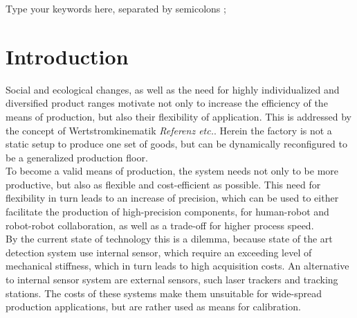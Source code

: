 \documentclass[5p,times,procedia]{elsarticle}
\begin{document}
\begin{frontmatter}
\begin{keyword}
Type your keywords here, separated by semicolons ;




\end{keyword}

\end{frontmatter}



\section{Introduction}

%
%
%
%
%

Social and ecological changes, as well as the need for
highly individualized and diversified product ranges
motivate not only to increase the efficiency of the means
of production, but also their flexibility of application.
This is addressed by the concept of Wertstromkinematik \textit{Referenz etc.}.
Herein the factory is not a static setup to produce
one set of goods, but can be dynamically reconfigured to be a generalized production floor.\\
To become a valid means of production, the system needs not only to
be more productive, but also as flexible and cost-efficient as possible. This need for flexibility in turn leads to an increase of precision, which can be used to either facilitate the production of high-precision components, for human-robot and robot-robot collaboration, as well as a trade-off for higher process speed.\\
By the current state of technology this is a dilemma, because state of the art detection system use internal sensor, which require an exceeding level of mechanical stiffness, which in turn leads to high
acquisition costs. An alternative to internal sensor system are external sensors, such laser trackers and tracking stations. The costs of these systems make them unsuitable for wide-spread production applications, but are rather used as means for calibration.\\
\end{document}

